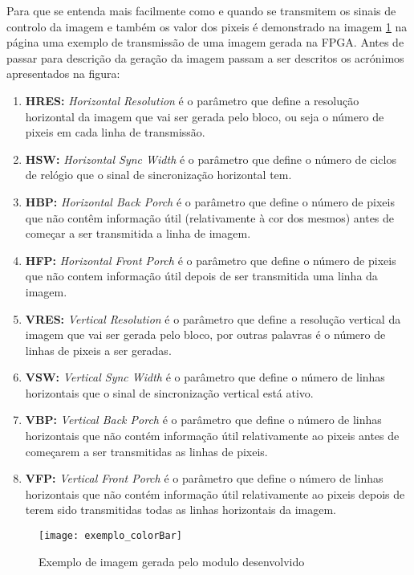 Para que se entenda mais facilmente como e quando se transmitem os sinais de controlo da imagem e também os valor dos pixeis é demonstrado na imagem \ref{fig:colorBar_exemple} na página \pageref{fig:colorBar_exemple} uma exemplo de transmissão de uma imagem gerada na FPGA. Antes de passar para descrição da geração da imagem passam a ser descritos os acrónimos apresentados na figura:

\begin{enumerate}
	\item \textbf{HRES:} \textit{Horizontal Resolution} é o parâmetro que define a resolução horizontal da imagem que vai ser gerada pelo bloco, ou seja o número de pixeis em cada linha de transmissão.
	\item \textbf{HSW:} \textit{Horizontal Sync Width} é o parâmetro que define o número de ciclos de relógio que o sinal de sincronização horizontal tem.
	\item \textbf{HBP:} \textit{Horizontal Back Porch} é o parâmetro que define o número de pixeis que não contêm informação útil (relativamente à cor dos mesmos) antes de começar a ser transmitida a linha de imagem.
	\item \textbf{HFP:} \textit{Horizontal Front Porch} é o parâmetro que define o número de pixeis que não contem informação útil depois de ser transmitida uma linha da imagem.
	\item \textbf{VRES:} \textit{Vertical Resolution} é o parâmetro que define a resolução vertical da imagem que vai ser gerada pelo bloco, por outras palavras é o número de linhas de pixeis a ser geradas.
	\item \textbf{VSW:} \textit{Vertical Sync Width} é o parâmetro que define o número de linhas horizontais que o sinal de sincronização vertical está ativo.
	\item \textbf{VBP:} \textit{Vertical Back Porch} é o parâmetro que define o número de linhas horizontais que não contém informação útil relativamente ao pixeis antes de começarem a ser transmitidas as linhas de pixeis.
	\item \textbf{VFP:} \textit{Vertical Front Porch} é o parâmetro que define o número de linhas horizontais que não contém informação útil relativamente ao pixeis depois de terem sido transmitidas todas as linhas horizontais da imagem.
\end{enumerate}
	
\begin{figure}[h!]
	\begin{center}
		\leavevmode
		\texttt{[image: exemplo\_colorBar]}
		\caption{Exemplo de imagem gerada pelo modulo desenvolvido}
		\label{fig:colorBar_exemple}
	\end{center}
\end{figure}

